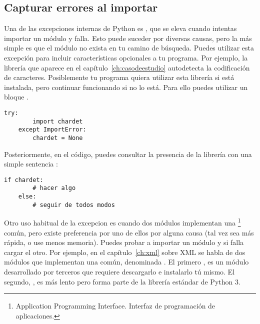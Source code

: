 \subsection {Capturar errores al importar}

Una de las excepciones internas de Python es , que se eleva cuando intentas importar un módulo y falla. Esto puede suceder por diversas causas, pero la más simple es que el módulo no exista en tu camino de búsqueda. Puedes utilizar esta excepción para incluir características opcionales a tu programa. Por ejemplo, la librería  que aparece en el capítulo~\ref{ch:casodeestudio} autodetecta la codificación de caracteres. Posiblemente tu programa quiera utilizar esta librería si está instalada, pero continuar funcionando si no lo está. Para ello puedes utilizar un bloque .

\noindent\begin{minipage}{\textwidth}
\begin{lstlisting}[mathescape=True]
    try:
        import chardet
    except ImportError:
        chardet = None
\end{lstlisting}
\end{minipage}

Posteriormente, en el código, puedes consultar la presencia de la librería con una simple sentencia :

\noindent\begin{minipage}{\textwidth}
\begin{lstlisting}[mathescape=True]
    if chardet:
        # hacer algo
    else:
        # seguir de todos modos
\end{lstlisting}
\end{minipage}

Otro uso habitual de la excepcion  es cuando dos módulos implementan una \footnote{Application Programming Interface. Interfaz de programación de aplicaciones.} común, pero existe preferencia por uno de ellos por alguna causa (tal vez sea más rápida, o use menos memoria). Puedes probar a importar un módulo y si falla cargar el otro. Por ejemplo, en el capítulo~\ref{ch:xml} sobre XML se habla de dos módulos que implementan una  común, denominada . El primero , es un módulo desarrollado por terceros que requiere descargarlo e instalarlo tú mismo. El segundo, , es más lento pero forma parte de la librería estándar de Python 3.


